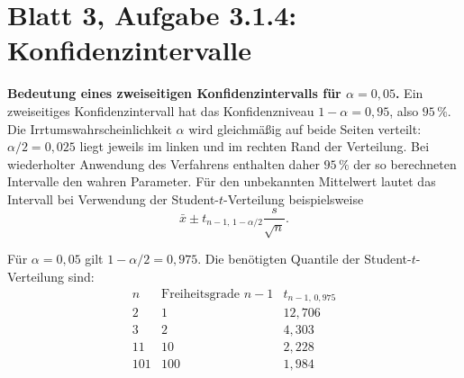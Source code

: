 \documentclass[a4paper,11pt]{article}
\begin{document}
\section*{Blatt 3, Aufgabe 3.1.4: Konfidenzintervalle}

\textbf{Bedeutung eines zweiseitigen Konfidenzintervalls für
\(\alpha=0{,}05\).}
Ein zweiseitiges Konfidenzintervall hat das Konfidenzniveau
\(1-\alpha=0{,}95\), also \(95\,\%\). Die Irrtumswahrscheinlichkeit
\(\alpha\) wird gleichmäßig auf beide Seiten verteilt:
\(\alpha/2=0{,}025\) liegt jeweils im linken und im rechten Rand der
Verteilung. Bei wiederholter Anwendung des Verfahrens enthalten daher
\(95\,\%\) der so berechneten Intervalle den wahren Parameter. Für den
unbekannten Mittelwert lautet das Intervall bei Verwendung der
Student-\(t\)-Verteilung beispielsweise
\[
\bar{x}\mathbin{\pm}t_{n-1,\,1-\alpha/2}\frac{s}{\sqrt{n}}.
\]

\medskip
\noindent Für \(\alpha=0{,}05\) gilt \(1-\alpha/2=0{,}975\). Die
benötigten Quantile der Student-\(t\)-Verteilung sind:
\[
\begin{array}{c|c|c}
n & \text{Freiheitsgrade }n-1 & t_{n-1,\,0{,}975}\\
\hline
2 & 1 & 12{,}706\\
3 & 2 & 4{,}303\\
11 & 10 & 2{,}228\\
101 & 100 & 1{,}984
\end{array}
\]
\end{document}
